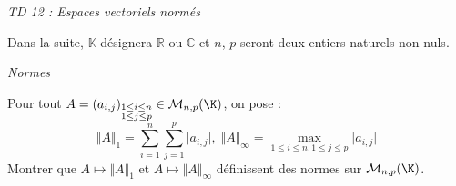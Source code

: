 \documentclass[a4paper,10pt]{report}
\begin{document}
\everymath{\displaystyle}

\begin{center}
\textit{{ {\huge TD 12 : Espaces vectoriels normés}}}
\end{center}


\bigskip

\noindent Dans la suite, $\mathbb{K}$ désignera $\mathbb{R}$ ou $\mathbb{C}$ et $n$, $p$ seront deux entiers naturels non nuls.

\medskip

\begin{center}
\textit{{ {\large Normes}}}
\end{center}

\medskip



\begin{Exercice}{} Pour tout $A = (a_{i,j})_{\substack{1 \leq i \leq n \\ 1 \leq j \leq p}} \in \mathcal{M}_{n,p}(\K)$, on pose :
$$\Vert A \Vert_{1}  = \sum_{i = 1}^{n} \sum_{j = 1}^{p} \vert a_{i,j} \vert, \; \Vert A \Vert_{\infty}  = \max_{1 \leq i \leq n,1 \leq j \leq p} \vert a_{i,j} \vert $$
Montrer que $A \mapsto \Vert A \Vert_{1}$ et $A \mapsto \Vert A \Vert_{\infty}$ définissent des normes sur $\mathcal{M}_{n,p}(\K)$.
\end{Exercice}
\end{document}
